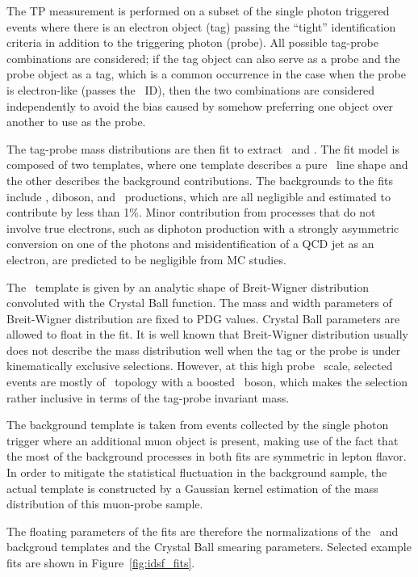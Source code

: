The TP measurement is performed on a subset of the single photon triggered events where there is an electron object (tag) passing the ``tight'' identification criteria in addition to the triggering photon (probe). 
All possible tag-probe combinations are considered; if the tag object can also serve as a probe and the probe object as a tag, which is a common occurrence in the case when the probe is electron-like (passes the \Pe\Pgg\ ID), then the two combinations are considered independently to avoid the bias caused by somehow preferring one object over another to use as the probe.

The tag-probe mass distributions are then fit to extract \npass\ and \nfail. 
The fit model is composed of two templates, where one template describes a pure \Zee\ line shape and the other describes the background contributions. 
The backgrounds to the fits include \wj, diboson, and \ttbar\ productions, which are all negligible and estimated to contribute by less than 1\%. 
Minor contribution from processes that do not involve true electrons, such as diphoton production with a strongly asymmetric conversion on one of the photons and misidentification of a QCD jet as an electron, are predicted to be negligible from MC studies.
 
The \Zee\ template is given by an analytic shape of Breit-Wigner distribution convoluted with the Crystal Ball function. 
The mass and width parameters of Breit-Wigner distribution are fixed to PDG values. 
Crystal Ball parameters are allowed to float in the fit. 
It is well known that Breit-Wigner distribution usually does not describe the mass distribution well when the tag or the probe is under kinematically exclusive selections. 
However, at this high probe \pt\ scale, selected events are mostly of \zj\ topology with a boosted \PZ\ boson, which makes the selection rather inclusive in terms of the tag-probe invariant mass.

The background template is taken from events collected by the single photon trigger where an
additional muon object is present, making use of the fact that the most of the background processes in both fits are symmetric in lepton flavor. 
In order to mitigate the statistical fluctuation in the background sample, the actual template is constructed by a Gaussian kernel estimation of the mass distribution of this muon-probe sample. 

The floating parameters of the fits are therefore the normalizations of the \Zee\ and backgroud templates and the Crystal Ball smearing parameters. 
Selected example fits are shown in Figure~\ref{fig:idsf_fits}.

